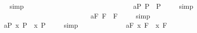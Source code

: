 \begin{isabellebody}
\isadelimproof
\ %
\endisadelimproof
%
\isatagproof
{}\isamarkupfalse%
\ simp\ \isamarkupfalse%
%
\endisatagproof
{\isafoldproof}%
%
\isadelimproof
%
\endisadelimproof
\ \ \ \ \ \ \ \ \ \ \ \ \ \ \ \ \ \ \ \ \ \ \ \ \ \ \ \isanewline
\isanewline
\ \isamarkupfalse%
\ a{}{}{\isacharunderscore}{}{\isacharunderscore}P{\isacharcolon}\ {\isachardoublequoteopen}{\isacharbrackleft}\isactrlbold {\isasymbox}\isactrlbold {\isasymdiamond}{\isasymphi}\isactrlsup P\ \isactrlbold {\isasymrightarrow}\ \isactrlbold {\isasymdiamond}{\isasymphi}\isactrlsup P{\isacharbrackright}\ {\isacharequal}\ {\isasymtop}{\isachardoublequoteclose}%
\isadelimproof
\ %
\endisadelimproof
%
\isatagproof
{}\isamarkupfalse%
\ simp\ \isamarkupfalse%
%
\endisatagproof
{\isafoldproof}%
%
\isadelimproof
%
\endisadelimproof
\ \ \ \ \ \ \ \ \ \ \ \ \ \ \ \ \ \ \ \ \ \ \ \isanewline
\ \isamarkupfalse%
\ a{}{}{\isacharunderscore}{}{\isacharunderscore}F{\isacharcolon}\ {\isachardoublequoteopen}{\isacharbrackleft}\isactrlbold {\isasymbox}\isactrlbold {\isasymdiamond}{\isasymphi}\isactrlsup F\ \isactrlbold {\isasymrightarrow}\ \isactrlbold {\isasymdiamond}{\isasymphi}\isactrlsup F{\isacharbrackright}\ {\isacharequal}\ {\isasymtop}{\isachardoublequoteclose}%
\isadelimproof
\ %
\endisadelimproof
%
\isatagproof
{}\isamarkupfalse%
\ simp\ \isamarkupfalse%
%
\endisatagproof
{\isafoldproof}%
%
\isadelimproof
%
\endisadelimproof
\ \ \ \ \ \ \ \ \ \ \ \ \ \ \ \ \ \ \ \ \ \ \ \isanewline
\ \isamarkupfalse%
\ a{}{}{\isacharunderscore}{}{\isacharunderscore}P{\isacharcolon}\ {\isachardoublequoteopen}{\isacharbrackleft}{\isacharparenleft}\isactrlbold {\isasymforall}x{\isachardot}\ \isactrlbold {\isasymbox}{\isasymphi}\isactrlsup P{\isacharparenright}\ \isactrlbold {\isasymrightarrow}\ \isactrlbold {\isasymbox}{\isacharparenleft}{\isacharparenleft}\isactrlbold {\isasymforall}x{\isachardot}\ {\isasymphi}\isactrlsup P{\isacharparenright}{\isacharparenright}{\isacharbrackright}\ {\isacharequal}\ {\isasymtop}{\isachardoublequoteclose}%
\isadelimproof
\ %
\endisadelimproof
%
\isatagproof
{}\isamarkupfalse%
\ simp\ \isamarkupfalse%
%
\endisatagproof
{\isafoldproof}%
%
\isadelimproof
%
\endisadelimproof
\ \ \ \ \ \ \ \ \ \isanewline
\ \isamarkupfalse%
\ a{}{}{\isacharunderscore}{}{\isacharunderscore}F{\isacharcolon}\ {\isachardoublequoteopen}{\isacharbrackleft}{\isacharparenleft}\isactrlbold {\isasymforall}x{\isachardot}\ \isactrlbold {\isasymbox}{\isasymphi}\isactrlsup F{\isacharparenright}\ \isactrlbold {\isasymrightarrow}\ \isactrlbold {\isasymbox}{\isacharparenleft}{\isacharparenleft}\isactrlbold {\isasymforall}x{\isachardot}\ {\isasymphi}\isactrlsup F{\isacharparenright}{\isacharparenright}{\isacharbrackright}\ {\isacharequal}\ {\isasymtop}{\isachardoublequoteclose}%

\end{isabellebody}

